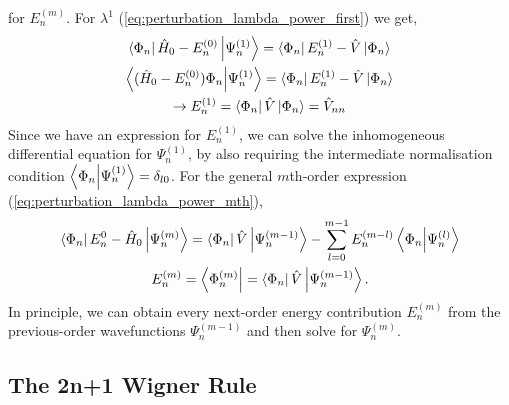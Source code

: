 for $E_n^{(m)}$. 
For $\lambda^1$ (\autoref{eq:perturbation_lambda_power_first}) we get,
\begin{equation}
    \begin{gathered}
    \bra{\Phi_n} \hat{H}_0 - E_n^{(0)}\ket{\Psi_n^{(1)}}
        = \bra{\Phi_n} E_n^{(1)} - \hat{V}\ket{\Phi_n} \\
    \bra{(\hat{H}_0 - E_n^{(0)})\Phi_n} \ket{\Psi_n^{(1)}}
        = \bra{\Phi_n} E_n^{(1)} - \hat{V}\ket{\Phi_n} \\
    \to E_n^{(1)} = \bra{\Phi_n} \hat{V} \ket{\Phi_n} = \hat{V}_{nn}
    \end{gathered}
\end{equation}
Since we have an expression for $E_n^{(1)}$, we can solve the inhomogeneous 
differential equation for $\Psi_n^{(1)}$, by also requiring the intermediate
normalisation condition $\braket{\Phi_n}{\Psi_n^{(1)}} = \delta_{l0}$. For 
the general $m$th-order expression (\autoref{eq:perturbation_lambda_power_mth}),
\begin{equation}
    \begin{gathered}
        \bra{\Phi_n} E_n^{0} - \hat{H}_0\ket{\Psi_n^{(m)}}
            = \bra{\Phi_n} \hat{V} \ket{\Psi_n^{(m-1)}}
            - \sum_{l=0}^{m-1}E_n^{(m-l)}\braket{\Phi_n}{\Psi_n^{(l)}} \\
        E_n^{(m)} = \bra{\Phi_n^{(m)}} = \bra{\Phi_n} \hat{V} \ket{\Psi_n^{(m-1)}}.
    \end{gathered}
\end{equation} 
In principle, we can obtain every next-order energy contribution $E_n^{(m)}$ from 
the previous-order wavefunctions $\Psi_n^{(m-1)}$ and then solve for $\Psi_n^{(m)}$.

\subsection{The 2n+1 Wigner Rule}

